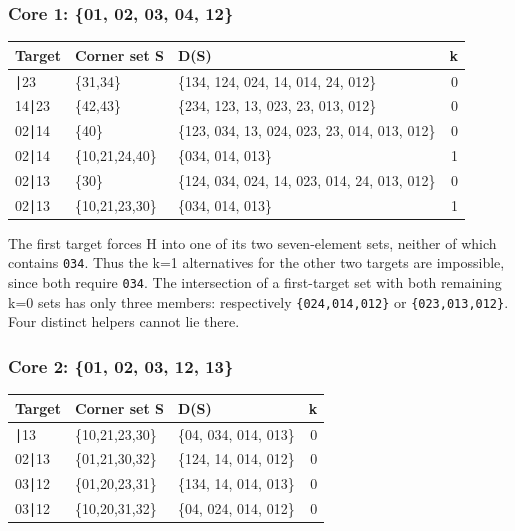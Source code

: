 \documentclass[
  10pt,
]{article}
\begin{document}
\hypertarget{core-1-01-02-03-04-12}{%
\subsubsection*{Core 1: \{01, 02, 03, 04,
12\}}\label{core-1-01-02-03-04-12}}

\begin{longtable}[]{@{}lllr@{}}
\toprule\noalign{}
Target & Corner set S & D(S) & k \\
\midrule\noalign{}
\endhead
\bottomrule\noalign{}
\endlastfoot
14∣23 & \{31,34\} & \{134, 124, 024, 14, 014, 24, 012\} & 0 \\
14∣23 & \{42,43\} & \{234, 123, 13, 023, 23, 013, 012\} & 0 \\
02∣14 & \{40\} & \{123, 034, 13, 024, 023, 23, 014, 013, 012\} & 0 \\
02∣14 & \{10,21,24,40\} & \{034, 014, 013\} & 1 \\
02∣13 & \{30\} & \{124, 034, 024, 14, 023, 014, 24, 013, 012\} & 0 \\
02∣13 & \{10,21,23,30\} & \{034, 014, 013\} & 1 \\
\end{longtable}

The first target forces H into one of its two seven-element sets,
neither of which contains \texttt{034}. Thus the k=1 alternatives for
the other two targets are impossible, since both require \texttt{034}.
The intersection of a first-target set with both remaining k=0 sets has
only three members: respectively \texttt{\{024,014,012\}} or
\texttt{\{023,013,012\}}. Four distinct helpers cannot lie there.

\hypertarget{core-2-01-02-03-12-13}{%
\subsubsection*{Core 2: \{01, 02, 03, 12,
13\}}\label{core-2-01-02-03-12-13}}

\begin{longtable}[]{@{}lllr@{}}
\toprule\noalign{}
Target & Corner set S & D(S) & k \\
\midrule\noalign{}
\endhead
\bottomrule\noalign{}
\endlastfoot
02∣13 & \{10,21,23,30\} & \{04, 034, 014, 013\} & 0 \\
02∣13 & \{01,21,30,32\} & \{124, 14, 014, 012\} & 0 \\
03∣12 & \{01,20,23,31\} & \{134, 14, 014, 013\} & 0 \\
03∣12 & \{10,20,31,32\} & \{04, 024, 014, 012\} & 0 \\
\end{longtable}
\end{document}

